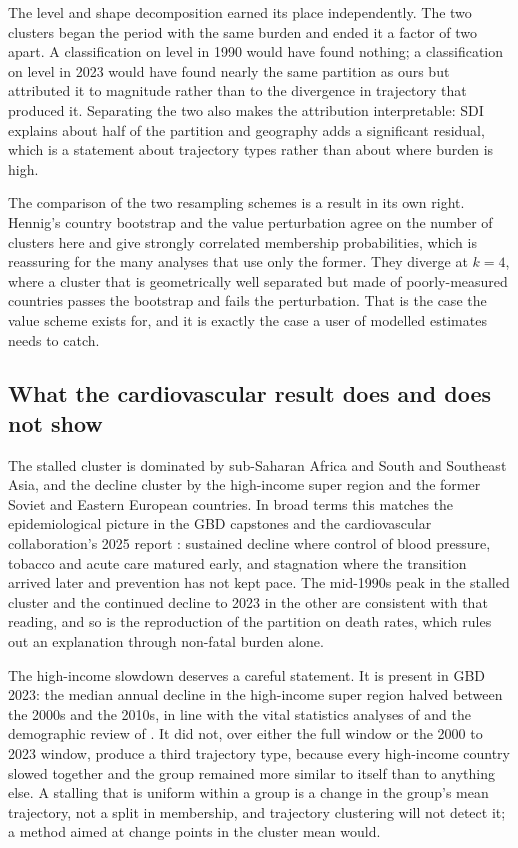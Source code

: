 \documentclass[11pt,a4paper]{article}
\begin{document}
The level and shape decomposition earned its place independently. The two clusters began the period with the same burden and ended it a factor of two apart. A classification on level in 1990 would have found nothing; a classification on level in 2023 would have found nearly the same partition as ours but attributed it to magnitude rather than to the divergence in trajectory that produced it. Separating the two also makes the attribution interpretable: SDI explains about half of the partition and geography adds a significant residual, which is a statement about trajectory types rather than about where burden is high.

The comparison of the two resampling schemes is a result in its own right. Hennig's country bootstrap and the value perturbation agree on the number of clusters here and give strongly correlated membership probabilities, which is reassuring for the many analyses that use only the former. They diverge at $k = 4$, where a cluster that is geometrically well separated but made of poorly-measured countries passes the bootstrap and fails the perturbation. That is the case the value scheme exists for, and it is exactly the case a user of modelled estimates needs to catch.

\subsection{What the cardiovascular result does and does not show}

The stalled cluster is dominated by sub-Saharan Africa and South and Southeast Asia, and the decline cluster by the high-income super region and the former Soviet and Eastern European countries. In broad terms this matches the epidemiological picture in the GBD capstones and the cardiovascular collaboration's 2025 report \citep{gbdcvd2025,gbd2023cod}: sustained decline where control of blood pressure, tobacco and acute care matured early, and stagnation where the transition arrived later and prevention has not kept pace. The mid-1990s peak in the stalled cluster and the continued decline to 2023 in the other are consistent with that reading, and so is the reproduction of the partition on death rates, which rules out an explanation through non-fatal burden alone.

The high-income slowdown deserves a careful statement. It is present in GBD 2023: the median annual decline in the high-income super region halved between the 2000s and the 2010s, in line with the vital statistics analyses of \citet{lopez2019} and the demographic review of \citet{dowd2025}. It did not, over either the full window or the 2000 to 2023 window, produce a third trajectory type, because every high-income country slowed together and the group remained more similar to itself than to anything else. A stalling that is uniform within a group is a change in the group's mean trajectory, not a split in membership, and trajectory clustering will not detect it; a method aimed at change points in the cluster mean would.
\end{document}
